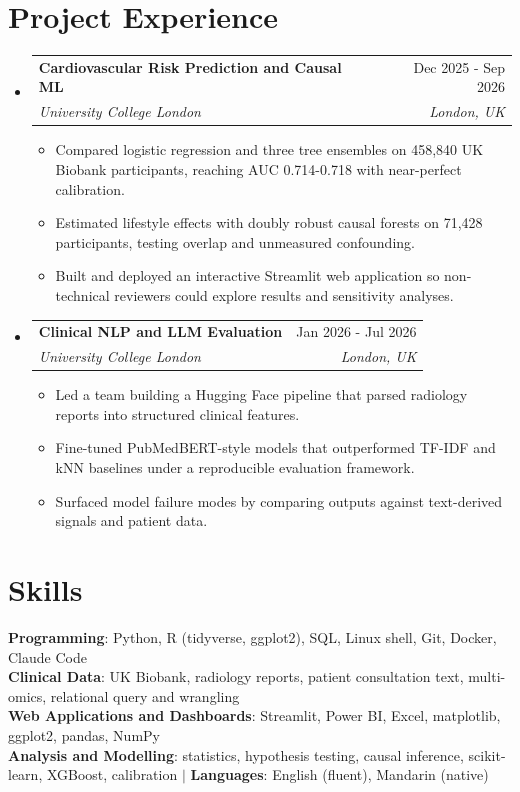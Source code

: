 \documentclass[letterpaper,11pt]{article}
\makeatletter
\newcommand{\resumeItem}[1]{\item\small{{#1 \vspace{-2pt}}}}
\newcommand{\resumeSubheading}[4]{\vspace{-2pt}\item\begin{tabular*}{0.97\textwidth}[t]{l@{\extracolsep{\fill}}r}\textbf{#1} & #2 \\\textit{\small#3} & \textit{\small #4} \\\end{tabular*}\vspace{-7pt}}
\newcommand{\resumeSubHeadingListStart}{\begin{itemize}[leftmargin=0.15in,label={}]}\newcommand{\resumeSubHeadingListEnd}{\end{itemize}}
\newcommand{\resumeItemListStart}{\begin{itemize}}\newcommand{\resumeItemListEnd}{\end{itemize}\vspace{-5pt}}
\makeatother
\begin{document}
\section{\textbf{Project Experience}}\resumeSubHeadingListStart
\resumeSubheading{Cardiovascular Risk Prediction and Causal ML}{Dec 2025 - Sep 2026}{University College London}{London, UK}\resumeItemListStart
\resumeItem{Compared logistic regression and three tree ensembles on 458,840 UK Biobank participants, reaching AUC 0.714-0.718 with near-perfect calibration.}
\resumeItem{Estimated lifestyle effects with doubly robust causal forests on 71,428 participants, testing overlap and unmeasured confounding.}
\resumeItem{Built and deployed an interactive Streamlit web application so non-technical reviewers could explore results and sensitivity analyses.}\resumeItemListEnd
\resumeSubheading{Clinical NLP and LLM Evaluation}{Jan 2026 - Jul 2026}{University College London}{London, UK}\resumeItemListStart
\resumeItem{Led a team building a Hugging Face pipeline that parsed radiology reports into structured clinical features.}
\resumeItem{Fine-tuned PubMedBERT-style models that outperformed TF-IDF and kNN baselines under a reproducible evaluation framework.}
\resumeItem{Surfaced model failure modes by comparing outputs against text-derived signals and patient data.}\resumeItemListEnd\resumeSubHeadingListEnd
\section{\textbf{Skills}}\begin{itemize}[leftmargin=0.15in,label={}]\small{\item{\textbf{Programming}: Python, R (tidyverse, ggplot2), SQL, Linux shell, Git, Docker, Claude Code \\
\textbf{Clinical Data}: UK Biobank, radiology reports, patient consultation text, multi-omics, relational query and wrangling \\
\textbf{Web Applications and Dashboards}: Streamlit, Power BI, Excel, matplotlib, ggplot2, pandas, NumPy \\
\textbf{Analysis and Modelling}: statistics, hypothesis testing, causal inference, scikit-learn, XGBoost, calibration $|$ \textbf{Languages}: English (fluent), Mandarin (native)}}\end{itemize}
\end{document}
